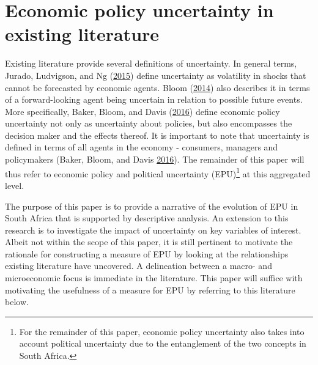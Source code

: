 \documentclass[11pt,preprint, authoryear]{elsarticle}
\numberwithin{equation}{section}
\numberwithin{figure}{section}
\numberwithin{table}{section}
\let\rmarkdownfootnote\footnote%
\def\footnote{\protect\rmarkdownfootnote}
\begin{document}
\section{\texorpdfstring{Economic policy uncertainty in existing
literature
\label{sec_litreview}}{Economic policy uncertainty in existing literature }}\label{economic-policy-uncertainty-in-existing-literature}

Existing literature provide several definitions of uncertainty. In
general terms, Jurado, Ludvigson, and Ng
(\protect\hyperlink{ref-Jurado2015}{2015}) define uncertainty as
volatility in shocks that cannot be forecasted by economic agents. Bloom
(\protect\hyperlink{ref-Bloom2014}{2014}) also describes it in terms of a forward-looking agent being uncertain in relation to possible future events. More specifically, Baker, Bloom, and Davis
(\protect\hyperlink{ref-Baker2016}{2016}) define economic policy
uncertainty not only as uncertainty about policies, but also encompasses the decision maker and the effects thereof. It is
important to note that uncertainty is defined in terms of all agents in
the economy - consumers, managers and policymakers (Baker, Bloom, and Davis
\protect\hyperlink{ref-Baker2016}{2016}). The remainder of this paper will thus refer to economic policy and political uncertainty (EPU)\footnote{For the remainder of this paper, economic policy uncertainty also takes into account political uncertainty due to the entanglement of the two concepts in South Africa.} at this aggregated level.

The purpose of this paper is to provide a narrative of the
evolution of EPU in South Africa that is supported by descriptive analysis. An extension to this research
is to investigate the impact of uncertainty on key variables of
interest. Albeit not within the scope of this paper, it is still
pertinent to motivate the rationale for constructing a measure of EPU by
looking at the relationships existing literature have uncovered. A
delineation between a macro- and microeconomic focus is immediate in
the literature. This paper will suffice with motivating the usefulness
of a measure for EPU by referring to this literature below.
\end{document}
